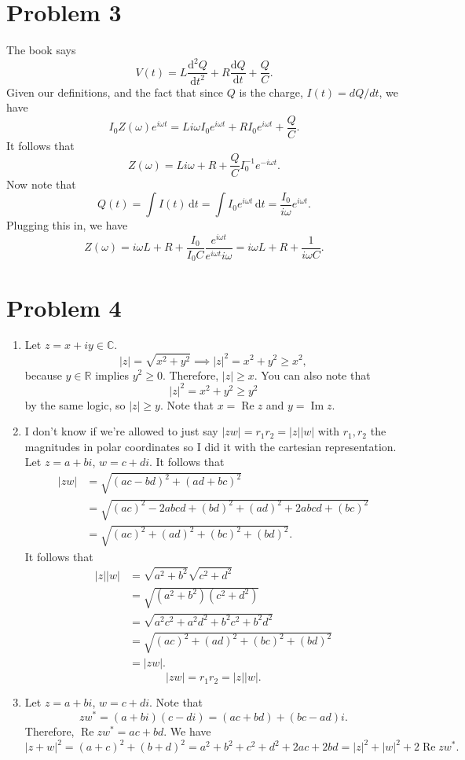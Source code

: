 \documentclass[11pt, letterpaper]{article}
\begin{document}
\section*{Problem 3}
The book says
\[
	V(t)=L \frac{\mathrm{d}^2Q}{\mathrm{d}t^2} +R \frac{\mathrm{d}Q}{\mathrm{d}t} +\frac{Q}{C} 
.\]
Given our definitions, and the fact that since $Q$ is the charge, $I(t)=dQ/dt$, we have
\[
	I_0Z(\omega )e^{i\omega t} =Li\omega I_0e^{i\omega t} +RI_0e^{i\omega t} +\frac{Q}{C} 
.\]
It follows that
\[
	Z(\omega )=Li\omega +R+\frac{Q}{C} I_0^{-1} e^{-i\omega t} 
.\]
Now note that
\[
	Q(t)=\int I(t) \,\mathrm{d} t=\int I_0e^{i\omega t}  \,\mathrm{d} t=\frac{I_0}{i\omega } e^{i\omega t} 
.\]
Plugging this in, we have
\[
	Z(\omega )=i\omega L+R+\frac{I_0}{I_0C} \frac{e^{i\omega t} }{e^{i\omega t} i\omega } =i\omega L+R+\frac{1}{i\omega C} 
.\]
\section*{Problem 4}
\begin{enumerate}
	\item Let $z=x+iy\in\mathbb{C} $.
		\[
			\left| z \right| =\sqrt{x^2+y^2} \implies \left| z \right|^2=x^2+y^2\geq x^2
		,\]
		because $y\in\mathbb{R} $ implies $y^2\geq 0$. Therefore, $\left| z \right| \geq x$. You can also note that
		\[
			\left| z \right| ^2=x^2+y^2\geq y^2
		\]
		by the same logic, so $\left| z \right| \geq y$. Note that $x=\operatorname{Re} z$ and $y=\operatorname{Im} z$.
	\item I don't know if we're allowed to just say $\left| zw \right| =r_1r_2=\left| z \right| \left| w \right| $ with $r_1,r_2$ the magnitudes in polar coordinates so I did it with the cartesian representation. Let $z=a+bi$, $w=c+di$. It follows that
		\begin{align*}
			\left| zw \right| &=\sqrt{\left( ac-bd \right) ^2+(ad+bc)^2} \\
					  &=\sqrt{(ac)^2-2abcd+(bd)^2+(ad)^2+2abcd+(bc)^2} \\
					  &=\sqrt{(ac)^2+(ad)^2+(bc)^2+(bd)^2} 
		.\end{align*}
		It follows that
		\begin{align*}
			\left| z \right| \left| w \right| &=\sqrt{a^2+b^2} \sqrt{c^2+d^2} \\
							  &=\sqrt{\left( a^2+b^2 \right) \left( c^2+d^2 \right) } \\
							  &=\sqrt{a^2c^2+a^2d^2+b^2c^2+b^2d^2} \\
							  &=\sqrt{(ac)^2+(ad)^2+(bc)^2+(bd)^2} \\
							  &=\left| zw \right| 
		.\end{align*}
		\[
			\left| zw \right| =r_1r_2=\left| z \right| \left| w \right| 
		.\]
	\item Let $z=a+bi$, $w=c+di$. Note that
		\[
			zw^*=(a+bi)(c-di)=(ac+bd)+(bc-ad)i
		.\]
		Therefore, $\operatorname{Re} zw^*=ac+bd$. We have
		\[
			\left| z+w \right|^2=\left( a+c \right)^2+\left( b+d \right)^2=a^2+b^2+c^2+d^2+2ac+2bd=\left| z \right|^2+\left| w \right|^2+2 \operatorname{Re} zw^*
		.\]
\end{enumerate}
\end{document}

